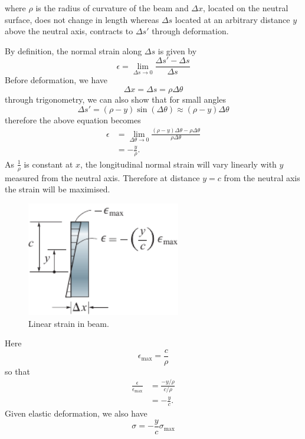 \documentclass{article}
\begin{document}
where \(\rho\) is the radius of curvature of the beam and \(\Delta{x}\), located on the neutral surface, does not change in length
whereas \(\Delta{s}\) located at an arbitrary distance \(y\) above the neutral axis, contracts to \(\Delta{s}'\) through deformation.

By definition, the normal strain along \(\Delta{s}\) is given by
\begin{equation*}
    \epsilon = \lim_{\Delta{s} \to 0} \frac{\Delta{s}' - \Delta{s}}{\Delta{s}}
\end{equation*}
Before deformation, we have
\begin{equation*}
    \Delta{x} = \Delta{s} = \rho \Delta{\theta}
\end{equation*}
through trigonometry, we can also show that for small angles
\begin{equation*}
    \Delta{s}' = \left( \rho - y \right) \sin{\left( \Delta{\theta} \right)} \approx \left( \rho - y \right) \Delta{\theta}
\end{equation*}
therefore the above equation becomes
\begin{align*}
    \epsilon & = \lim_{\Delta{\theta} \to 0} \frac{\left( \rho - y \right) \Delta{\theta} - \rho \Delta{\theta}}{\rho \Delta{\theta}} \\
             & = - \frac{y}{\rho}.
\end{align*}
As \(\frac{1}{\rho}\) is constant at \(x\), the longitudinal normal strain will vary linearly with \(y\) measured from the neutral axis.
Therefore at distance \(y = c\) from the neutral axis the strain will be maximised.
\begin{figure}[H]
    \centering
    \includegraphics[height = 5cm, keepaspectratio = true]{figures/beam_strain.pdf}
    \caption{Linear strain in beam.} %
\end{figure}
Here
\begin{equation*}
    \epsilon_{\text{max}} = \frac{c}{\rho}
\end{equation*}
so that
\begin{align*}
    \frac{\epsilon}{\epsilon_{\text{max}}} & = \frac{-y/\rho}{c/\rho} \\
                                           & = -\frac{y}{c}.
\end{align*}
Given elastic deformation, we also have
\begin{equation*}
    \sigma = -\frac{y}{c}\sigma_{\text{max}}
\end{equation*}
\end{document}
